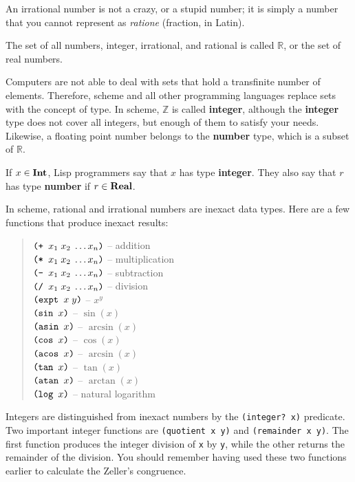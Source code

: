 \documentclass[a4paper,12pt]{book}
\begin{document}
An irrational number
is not a crazy, or a stupid number; it is simply a number that you cannot represent
as {\em ratione} (fraction, in Latin).

The set of all numbers, integer, 
irrational, and rational is called $\mathbb{R}$, or
the set of real numbers. 

Computers are not able to deal
with sets that hold a transfinite number of
elements. Therefore, scheme and
all other programming languages
replace sets with the concept of type.
In scheme, $\mathbb{Z}$ is 
called {\bf integer}, although
the {\bf integer} type does not cover all integers, 
but enough of them to satisfy
your needs. Likewise, a floating point
number belongs to the {\bf number} type, 
which is a subset of $\mathbb{R}$.


If $x\in{\bf Int}$, Lisp programmers say 
that $x$ has 
type\label{type:definition}  {\bf integer}. 
They also say that $r$ has 
type {\bf number} if $r\in {\bf Real}$.

In scheme, rational and irrational numbers
are inexact data types. Here are a few functions
that produce inexact results:
\begin{quote}
$\verb|(+ |x_1\;x_2\;\ldots x_n\verb|)|$ -- addition\\
$\verb|(* |x_1\;x_2\;\ldots x_n\verb|)|$ -- multiplication\\
$\verb|(- |x_1\;x_2\;\ldots x_n\verb|)|$ -- subtraction\\
$\verb|(/ |x_1\;x_2\;\ldots x_n\verb|)|$ -- division\\
$\verb|(expt |x\;y\verb|)|$ -- $x^y$\\
$\verb|(sin | x \verb|)|$ -- $\sin(x)$\\
$\verb|(asin | x \verb|)|$ -- $\arcsin(x)$\\
$\verb|(cos | x \verb|)|$ -- $\cos(x)$\\
$\verb|(acos | x \verb|)|$ -- $\arcsin(x)$\\ 
$\verb|(tan | x \verb|)|$ -- $\tan(x)$\\
$\verb|(atan | x \verb|)|$ -- $\arctan(x)$\\
$\verb|(log | x \verb|)|$ -- natural logarithm\\
\end{quote}
Integers are distinguished from inexact numbers
by the \verb|(integer? x)| predicate. Two important
integer functions are \verb|(quotient x y)| and
\verb|(remainder x y)|. The first function
produces the integer division of \verb|x|
by \verb|y|, while the other returns
the remainder of the division. You should remember
having used
these two functions earlier to calculate the Zeller's
congruence.
\end{document}
